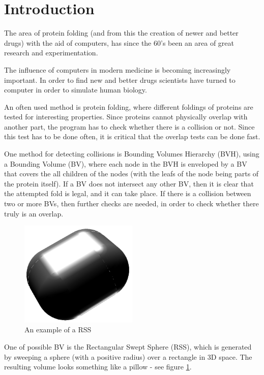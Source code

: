 
\section{Introduction}
\label{introduction}



The area of protein folding (and from this the creation of newer and better drugs) with the aid of computers, has since the 60's been an area of great research and experimentation. 


The influence of computers in modern medicine is becoming increasingly important. In order to find new and better drugs scientists have turned to computer in order to simulate human biology.

An often used method is protein folding, where different foldings of proteins are tested for interesting properties. Since proteins cannot physically overlap with another part, the program has to check whether there is a collision or not. Since this test has to be done often, it is critical that the overlap tests can be done fast. 

One method for detecting collisions is Bounding Volumes Hierarchy (BVH), using a Bounding Volume (BV), where each node in the BVH is enveloped by a BV that covers the all children of the nodes (with the leafs of the node being parts of the protein itself). If a BV does not intersect any other BV, then it is clear that the attempted fold is legal, and it can take place. If there is a collision between two or more BVs, then further checks are needed, in order to check whether there truly is an overlap.

\begin{figure}
\centering
\includegraphics[width=0.5\textwidth]{figures/rss}
\caption{\label{rss-example-figure}An example of a RSS}
\end{figure}

One of possible BV is the Rectangular Swept Sphere (RSS), which is generated by sweeping a sphere (with a positive radius) over a rectangle in 3D space. The resulting volume looks something like a pillow - see figure \ref{rss-example-figure}. 

